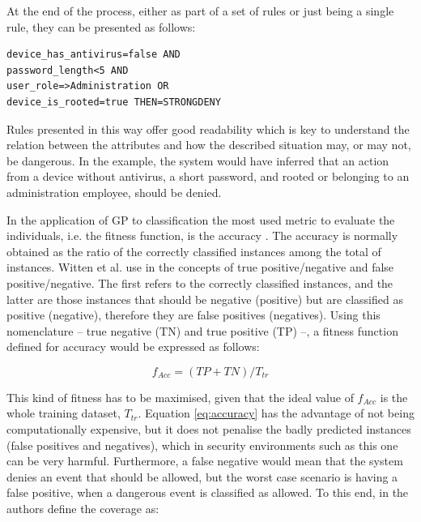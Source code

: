 \documentclass[runningheads]{llncs}
\begin{document}
At the end of the process, either as part of a set of rules or just being a single rule, they can be presented as follows:

\begin{verbatim}
device_has_antivirus=false AND
password_length<5 AND
user_role=>Administration OR
device_is_rooted=true THEN=STRONGDENY
\end{verbatim}

Rules presented in this way offer good readability which is key to understand the relation between the attributes and how the described situation may, or may not, be dangerous. In the example, the system would have inferred that an action from a device without antivirus, a short password, and rooted or belonging to an administration employee, should be denied.

\label{subsec:chossingfitness}

In the application of GP to classification
the most used metric to evaluate the individuals, i.e. the fitness function, is the accuracy
\cite{espejo2010survey}. The accuracy is normally obtained as the
ratio of the correctly classified instances among the total of
instances. Witten et al. use in \cite{witten2005data} the
concepts of true positive/negative and false positive/negative. The
first refers to the correctly classified instances, and the latter are
those instances that should be negative (positive) but are classified
as positive (negative), therefore they are false positives
(negatives). Using this nomenclature -- true negative (TN) and true positive (TP) --, a fitness function defined for
accuracy would be expressed as follows: 

\begin{equation}
\label{eq:accuracy}
f_{Acc} = (TP + TN) / T_{tr}
\end{equation}

This kind of fitness has to be maximised, given that the ideal value
of $f_{Acc}$ is the whole training dataset, $T_{tr}$. Equation \ref{eq:accuracy} has the 
advantage of not being computationally expensive, but it does not
penalise the badly predicted instances (false positives and
negatives), which in security environments such as this one can be
very harmful. Furthermore, a false negative would mean that the system denies an event that should be allowed, but the worst case scenario is having a false positive, when a dangerous event is classified as allowed.
To this end, in \cite{witten2005data} the authors define the coverage as:
\end{document}
